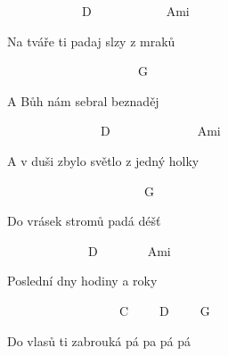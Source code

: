 ~~~~~~~~~~~~D~~~~~~~~~~~~Ami~~

Na tváře ti padaj slzy z mraků

~~~~~~~~~~~~~~~~~~~~~G~~

A Bůh nám sebral beznaděj

~~~~~~~~~~~~~~~D~~~~~~~~~~~~~~Ami~~

A v duši zbylo světlo z jedný holky

~~~~~~~~~~~~~~~~~~~~~~G~~~

Do vrásek stromů padá déšť

~~~~~~~~~~~~~D~~~~~~~~Ami~

Poslední dny hodiny a roky

~~~~~~~~~~~~~~~~~~C~~~~~D~~~~~G~

Do vlasů ti zabrouká pá pa pá pá

\bigskip

\chorus